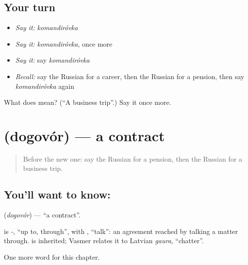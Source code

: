\subsection*{Your turn}
\begin{itemize}
\raggedright
  \item \emph{Say it:} \emph{komandiróvka}
  \item \emph{Say it:} \emph{komandiróvka}, once more
  \item \emph{Say it:} say \emph{komandiróvka}
  \item \emph{Recall:} say the Russian for a career, then the Russian for a pension, then say \emph{komandiróvka} again
\end{itemize}

\begin{tcolorbox}[breakable,colback=teal!4,colframe=teal!35!black,title={Before you move on}]
What does  mean? (\textquotedblleft{}A business trip\textquotedblright{}.) Say it once more.
\end{tcolorbox}
\section[\texorpdfstring{\ru{договор} (dogovór)}{договор (dogovór)}]{ (dogovór) — a contract}

\label{lesson:RU-C172-dogovor}



\begin{quote}
Before the new one: say the Russian for a pension, then the Russian for a business trip.
\end{quote}

\subsection*{You'll want to know: }
\textbf{} (\emph{dogovór}) — \textquotedblleft{}a contract\textquotedblright{}.

\begin{cousinweb}
\textbf{} is \emph{-}, \textquotedblleft{}up to, through\textquotedblright{}, with \emph{}, \textquotedblleft{}talk\textquotedblright{}: an agreement reached by talking a matter through. \emph{} is inherited; Vasmer relates it to Latvian \emph{gaura}, \textquotedblleft{}chatter\textquotedblright{}.
\end{cousinweb}

\begin{grammarlens}[title={What you've built}]
One more word for this chapter.
\end{grammarlens}

